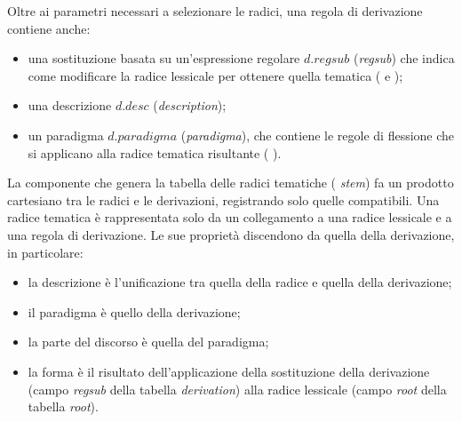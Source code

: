 \documentclass[twoside,stylearticle,11pt,filologia,it,article,bibsection]{spinoza}
\begin{document}

Oltre ai parametri necessari a selezionare le radici, una regola di
derivazione contiene anche:
\begin{itemize}
\item una sostituzione basata su un'espressione regolare $d.{regsub}$
  ({\it regsub}) che indica come modificare la radice lessicale per
  ottenere quella tematica (\vedi {} e
  );
\item una descrizione $d.desc$ ({\it description});
\item un paradigma $d.paradigma$ ({\it paradigma}), che contiene le regole di
  flessione che si applicano alla radice tematica risultante (\vedi
  ).
\end{itemize}

La componente che genera la tabella delle radici tematiche ({\it
  stem}) fa un prodotto cartesiano tra le radici e le derivazioni,
registrando solo quelle compatibili. Una radice tematica è
rappresentata solo da un collegamento a una radice lessicale e a una
regola di derivazione. Le sue proprietà discendono da quella della
derivazione, in particolare:
\begin{itemize}
\item la descrizione è l'unificazione tra quella della radice e quella della derivazione;
\item il paradigma è quello della derivazione;
\item la parte del discorso è quella del paradigma;
\item la forma è il risultato dell'applicazione della sostituzione
  della derivazione (campo {\it regsub} della tabella {\it
    derivation}) alla radice lessicale (campo {\it root} della tabella
  {\it root}).
\end{itemize}
\end{document}
